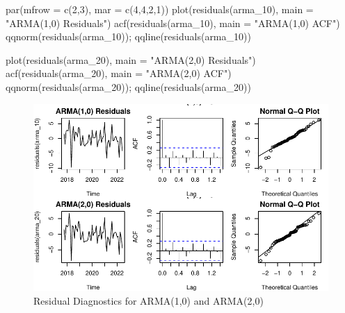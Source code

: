 \documentclass[
  11pt,
]{article}
\newenvironment{Shaded}{\begin{snugshade}}{\end{snugshade}}
\newcommand{\AttributeTok}[1]{\textcolor[rgb]{0.40,0.45,0.13}{#1}}
\newcommand{\DecValTok}[1]{\textcolor[rgb]{0.68,0.00,0.00}{#1}}
\newcommand{\FunctionTok}[1]{\textcolor[rgb]{0.28,0.35,0.67}{#1}}
\newcommand{\NormalTok}[1]{\textcolor[rgb]{0.00,0.23,0.31}{#1}}
\newcommand{\StringTok}[1]{\textcolor[rgb]{0.13,0.47,0.30}{#1}}
\begin{document}
\begin{Shaded}
\begin{Highlighting}[]
\FunctionTok{par}\NormalTok{(}\AttributeTok{mfrow =} \FunctionTok{c}\NormalTok{(}\DecValTok{2}\NormalTok{,}\DecValTok{3}\NormalTok{), }\AttributeTok{mar =} \FunctionTok{c}\NormalTok{(}\DecValTok{4}\NormalTok{,}\DecValTok{4}\NormalTok{,}\DecValTok{2}\NormalTok{,}\DecValTok{1}\NormalTok{))}
\FunctionTok{plot}\NormalTok{(}\FunctionTok{residuals}\NormalTok{(arma\_10), }\AttributeTok{main =} \StringTok{"ARMA(1,0) Residuals"}\NormalTok{)}
\FunctionTok{acf}\NormalTok{(}\FunctionTok{residuals}\NormalTok{(arma\_10), }\AttributeTok{main =} \StringTok{"ARMA(1,0) ACF"}\NormalTok{)}
\FunctionTok{qqnorm}\NormalTok{(}\FunctionTok{residuals}\NormalTok{(arma\_10)); }\FunctionTok{qqline}\NormalTok{(}\FunctionTok{residuals}\NormalTok{(arma\_10))}

\FunctionTok{plot}\NormalTok{(}\FunctionTok{residuals}\NormalTok{(arma\_20), }\AttributeTok{main =} \StringTok{"ARMA(2,0) Residuals"}\NormalTok{)}
\FunctionTok{acf}\NormalTok{(}\FunctionTok{residuals}\NormalTok{(arma\_20), }\AttributeTok{main =} \StringTok{"ARMA(2,0) ACF"}\NormalTok{)}
\FunctionTok{qqnorm}\NormalTok{(}\FunctionTok{residuals}\NormalTok{(arma\_20)); }\FunctionTok{qqline}\NormalTok{(}\FunctionTok{residuals}\NormalTok{(arma\_20))}
\end{Highlighting}
\end{Shaded}

\begin{figure}[H]

{\centering \includegraphics{project_files/figure-pdf/fig-arma-diagnostics-1.pdf}

}

\caption{Residual Diagnostics for ARMA(1,0) and ARMA(2,0)}

\end{figure}%
\end{document}
